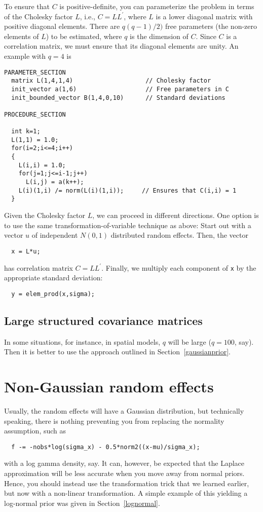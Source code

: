 \documentclass{admbmanual}
\begin{document}
To ensure that $C$ is positive-definite, you can parameterize the problem in
terms of the Cholesky factor $L$, i.e., $C=LL^\prime$, where $L$ is a lower
diagonal matrix with positive diagonal elements. There are $q(q-1)/2)$ free
parameters (the non-zero elements of $L$) to be estimated, where $q$ is the
dimension of $C$. Since $C$ is a correlation matrix, we must ensure that its
diagonal elements are unity. An example with $q=4$ is
\begin{lstlisting}
PARAMETER_SECTION
  matrix L(1,4,1,4)                    // Cholesky factor
  init_vector a(1,6)                   // Free parameters in C
  init_bounded_vector B(1,4,0,10)      // Standard deviations

PROCEDURE_SECTION

  int k=1;
  L(1,1) = 1.0;
  for(i=2;i<=4;i++)
  {
    L(i,i) = 1.0;
    for(j=1;j<=i-1;j++)
      L(i,j) = a(k++);
    L(i)(1,i) /= norm(L(i)(1,i));     // Ensures that C(i,i) = 1
  }
\end{lstlisting}
Given the Cholesky factor $L$, we can proceed in different directions. One
option is to use the same transformation-of-variable technique as above: Start
out with a vector $u$ of independent $N(0,1)$ distributed random effects. Then,
the vector
\begin{lstlisting}
  x = L*u;
\end{lstlisting}
has correlation matrix $C=LL^\prime$. Finally, we multiply each component of
\texttt{x} by the appropriate standard deviation:
\begin{lstlisting}
  y = elem_prod(x,sigma);
\end{lstlisting}

\subsection{Large structured covariance matrices}

In some situations, for instance, in spatial models, $q$ will be large ($q=100$,
say). Then it is better to use the approach outlined in
Section~\ref{gaussianprior}.

\section{Non-Gaussian random effects}

Usually, the random effects will have a Gaussian distribution, but technically
speaking, there is nothing preventing you from replacing the normality
assumption, such as
\begin{lstlisting}
  f -= -nobs*log(sigma_x) - 0.5*norm2((x-mu)/sigma_x);
\end{lstlisting}
with a log gamma density, say. It can, however, be expected that the Laplace
approximation will be less accurate when you move away from normal priors.
Hence, you should instead use the transformation trick that we learned earlier,
but now with a non-linear transformation. A simple example of this yielding a
log-normal prior was given in Section~\ref{lognormal}.
\end{document}
